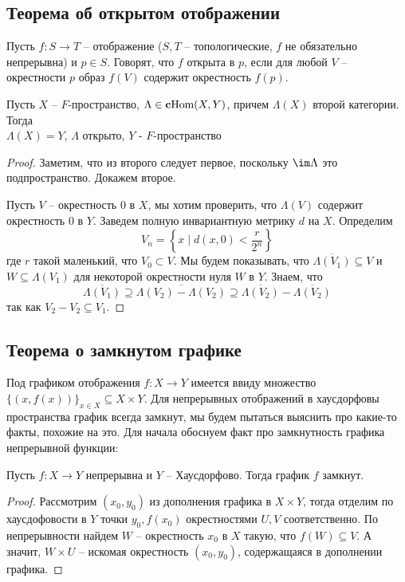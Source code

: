 \documentclass[12pt, a4paper, oneside]{book}
\begin{document}
\subsection{Теорема об открытом отображении}
Пусть $f:S \to T$ -- отображение {\footnotesize ($S,T$ -- топологические, $f$ не обязательно непрерывна)} и $p \in S$.
Говорят, что $f$ открыта в $p$, если для любой $V$ -- окрестности $p$ образ $f(V)$ содержит окрестность $f(p)$.
\begin{theorem}
   Пусть $X$ -- $F$-пространство, $\Lambda \in \text{\textbf{c}Hom}(X,Y)$, причем $\Lambda(X)$ второй категории. Тогда\\
     $\Lambda(X) = Y$, \; \; $\Lambda$ открыто,\; \; $Y$ - $F$-пространство
\end{theorem}
\begin{proof}
Заметим, что из второго следует первое, поскольку $\im \Lambda$ это подпространство. Докажем второе.

Пусть $V$ -- окрестность 0 в $X$, мы хотим проверить, что $\Lambda(V)$ содержит окрестность 0 в $Y$. Заведем полную инвариантную метрику $d$ на $X$.
    Определим $$V_n = \left\{x\; | \; d(x,0) < \frac{r}{2^n}\right\}$$
    где $r$ такой маленький, что $V_0 \subset V$. Мы будем показывать, что $\overline{\Lambda(V_1)}\subseteq V$ и $W \subseteq \Lambda(V_1)$ для некоторой окрестности нуля $W$ в $Y$.
    Знаем, что $$\overline{\Lambda(V_1)} \supseteq \overline{\Lambda(V_2) - \Lambda(V_2)} \supseteq \overline{\Lambda(V_2)} - \overline{\Lambda(V_2)}$$
    так как $V_2 - V_2 \subseteq V_1$.
\end{proof}


\subsection{Теорема о замкнутом графике}
Под графиком отображения $f: X \to Y$ имеется ввиду множество $\{(x,f(x))\}_{x \in X} \subseteq X \times Y$. Для непрерывных отображений в хаусдорфовы пространства график всегда замкнут, мы будем пытаться выяснить про какие-то факты, похожие на это.
Для начала обоснуем факт про замкнутность графика непрерывной функции:
\begin{remark}
Пусть $f:X \to Y$ непрерывна и $Y$ -- Хаусдорфово. Тогда график $f$ замкнут.
\end{remark}
\begin{proof}
Рассмотрим $(x_0, y_0)$ из дополнения графика в $X \times Y$, тогда отделим по хаусдофовости в $Y$ точки $y_0, f(x_0)$ окрестностями $U, V$ соответственно.
По непрерывности найдем $W$ -- окрестность $x_0$ в $X$ такую, что $f(W) \subseteq V$. А значит, $W \times U$ -- искомая окрестность $(x_0, y_0)$, содержащаяся в дополнении графика.
\end{proof}
\end{document}
